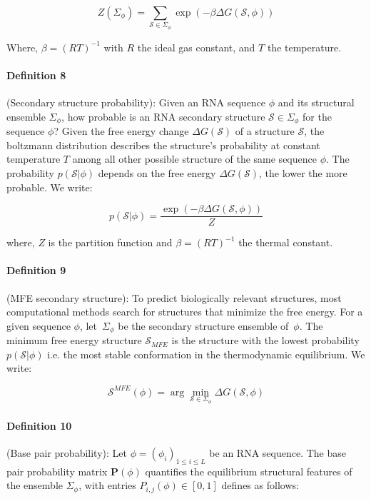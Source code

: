 \begin{equation}
	Z(\Sigma_{\phi}) = \sum_{\mathcal{S} \in \Sigma_{\phi} }{\exp(-\beta \Delta G(\mathcal{S}, \phi))}
\end{equation}

Where, $\beta = (RT)^{-1}$ with $R$ the ideal gas constant, and $T$ the temperature.

\paragraph{\textbf{Definition 8}} (Secondary structure probability):
Given an RNA sequence $\phi$ and its structural ensemble $\Sigma_{\phi}$, 
how probable is an RNA secondary structure $\mathcal{S} \in \Sigma_{\phi}$ for the sequence $\phi$? Given the free energy change $\Delta G(\mathcal{S})$ of a structure $\mathcal{S}$, the boltzmann distribution describes the structure's probability at constant temperature $T$ among all other possible structure of the same sequence $\phi$.
The probability $p(\mathcal{S}| \phi)$ depends on the free energy $\Delta G(\mathcal{S})$, the lower the more probable. We write: 

\begin{equation}
	p(\mathcal{S}| \phi)= \frac{\exp(-\beta \Delta G(\mathcal{S}, \phi))}{Z}
\end{equation}

where, $Z$ is the partition function and $\beta = (RT)^{-1}$ the thermal constant. 


\paragraph{\textbf{Definition 9}} (MFE secondary structure): 
To predict biologically relevant structures, most computational methods search for structures that minimize the free energy. For a given sequence $\phi$, let~\(\Sigma_{\phi}\) be the secondary structure ensemble of~\(\phi\). The minimum free energy structure $\mathcal{S}_{MFE}$ is the structure with the lowest probability $p(\mathcal{S}|\phi)$ i.e. the  most stable conformation in the thermodynamic equilibrium. We write:

\begin{equation}
\mathcal{S}^{MFE}(\phi) = \arg \min_{\mathcal{S} \in \Sigma_{\phi}} \Delta G(\mathcal{S}, \phi) 
\end{equation}

\paragraph{\textbf{Definition 10}}(Base pair probability): Let $\phi=(\phi_i)_{1\leq i \leq L} $ be an RNA sequence. The base pair probability matrix $\mathbf{P}(\phi)$ quantifies the equilibrium structural features of the ensemble $\Sigma_{\phi}$, with entries $P_{i,j}(\phi) \in [ 0,1]$ defines as follows: 

